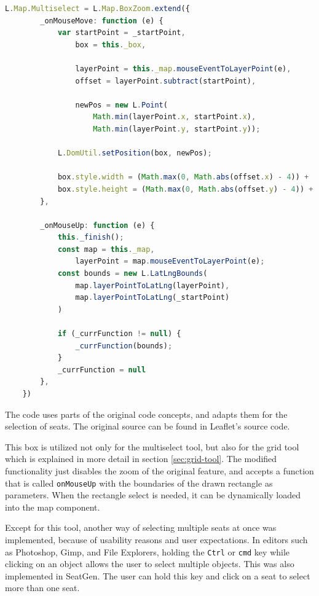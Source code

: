 \begin{lstlisting}[language=Typescript, caption={Multiselect Tool},label={lst:multiselect-tool}]
    L.Map.Multiselect = L.Map.BoxZoom.extend({
        _onMouseMove: function (e) {
            var startPoint = _startPoint,
                box = this._box,

                layerPoint = this._map.mouseEventToLayerPoint(e),
                offset = layerPoint.subtract(startPoint),

                newPos = new L.Point(
                    Math.min(layerPoint.x, startPoint.x),
                    Math.min(layerPoint.y, startPoint.y));

            L.DomUtil.setPosition(box, newPos);

            box.style.width = (Math.max(0, Math.abs(offset.x) - 4)) + 'px';
            box.style.height = (Math.max(0, Math.abs(offset.y) - 4)) + 'px';
        },

        _onMouseUp: function (e) {
            this._finish();
            const map = this._map,
                layerPoint = map.mouseEventToLayerPoint(e);
            const bounds = new L.LatLngBounds(
                map.layerPointToLatLng(layerPoint),
                map.layerPointToLatLng(_startPoint)
            )

            if (_currFunction != null) {
                _currFunction(bounds);
            }
            _currFunction = null
        },
    })
\end{lstlisting}

The code uses parts of the original code concepts, and adapts them for the selection of seats. The original source can be found in Leaflet's source code.

This box is utilized not only for the multiselect tool, but also for the grid tool which is explained in more detail in section \ref{sec:grid-tool}. The modified functionality just disables the zoom of the original feature, and accepts a function that is called \texttt{onMouseUp} with the boundaries of the drawn rectangle as parameters. When the rectangle select is needed, it can be dynamically loaded into the map component.

Except for this tool, another way of selecting multiple seats at once was implemented, because of usability reasons and user expectations. In editors such as Photoshop, Gimp, and File Explorers, holding the \texttt{Ctrl} or \texttt{cmd} key while clicking on an object allows the user to select multiple objects. This was also implemented in SeatGen. The user can hold this key and click on a seat to select more than one seat.